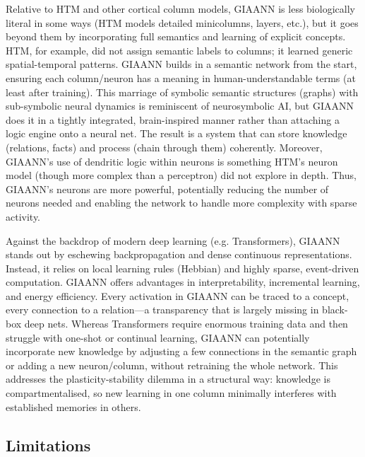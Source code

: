 Relative to HTM and other cortical column models, GIAANN is less biologically literal in some ways (HTM models detailed minicolumns, layers, etc.), but it goes beyond them by incorporating full semantics and learning of explicit concepts.
HTM, for example, did not assign semantic labels to columns; it learned generic spatial-temporal patterns.
GIAANN builds in a semantic network from the start, ensuring each column/neuron has a meaning in human-understandable terms (at least after training).
This marriage of symbolic semantic structures (graphs) with sub-symbolic neural dynamics is reminiscent of neurosymbolic AI, but GIAANN does it in a tightly integrated, brain-inspired manner rather than attaching a logic engine onto a neural net.
The result is a system that can store knowledge (relations, facts) and process (chain through them) coherently.
Moreover, GIAANN’s use of dendritic logic within neurons is something HTM’s neuron model (though more complex than a perceptron) did not explore in depth.
Thus, GIAANN’s neurons are more powerful, potentially reducing the number of neurons needed and enabling the network to handle more complexity with sparse activity.

Against the backdrop of modern deep learning (e.g. Transformers), GIAANN stands out by eschewing backpropagation and dense continuous representations.
Instead, it relies on local learning rules (Hebbian) and highly sparse, event-driven computation.
GIAANN offers advantages in interpretability, incremental learning, and energy efficiency.
Every activation in GIAANN can be traced to a concept, every connection to a relation---a transparency that is largely missing in black-box deep nets.
Whereas Transformers require enormous training data and then struggle with one-shot or continual learning, GIAANN can potentially incorporate new knowledge by adjusting a few connections in the semantic graph or adding a new neuron/column, without retraining the whole network. 
This addresses the plasticity-stability dilemma in a structural way: knowledge is compartmentalised, so new learning in one column minimally interferes with established memories in others.

\subsection{Limitations}

